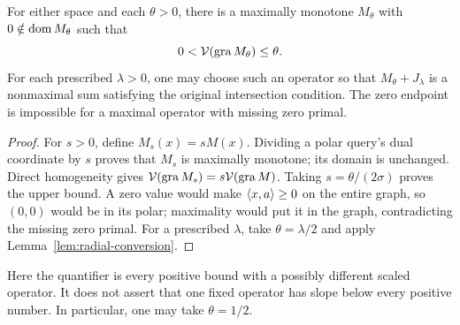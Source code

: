 \begin{corollary}\label{cor:flat}
For either space and each $\theta>0$, there is a maximally monotone
$M_\theta$ with $0\notin\operatorname{dom} M_\theta$ such that
\[
0<\mathcal V(\operatorname{gra} M_\theta)\le\theta.
\]
For each prescribed $\lambda>0$, one may choose such an operator so
that $M_\theta+J_\lambda$ is a nonmaximal sum satisfying the original
intersection condition. The zero endpoint is impossible for a maximal
operator with missing zero primal.
\end{corollary}
\begin{proof}
For $s>0$, define $M_s(x)=sM(x)$. Dividing a polar query's dual
coordinate by $s$ proves that $M_s$ is maximally monotone; its domain
is unchanged. Direct homogeneity gives
$\mathcal V(\operatorname{gra} M_s)=s\mathcal V(\operatorname{gra} M)$.
Taking $s=\theta/(2\sigma)$ proves the upper bound. A zero value would
make $\langle x,a\rangle\ge0$ on the entire graph, so $(0,0)$ would be in
its polar; maximality would put it in the graph, contradicting the
missing zero primal. For a prescribed $\lambda$, take
$\theta=\lambda/2$ and apply Lemma~\ref{lem:radial-conversion}.
\end{proof}
Here the quantifier is every positive bound with a possibly different
scaled operator. It does not assert that one fixed operator has slope
below every positive number. In particular, one may take $\theta=1/2$.

